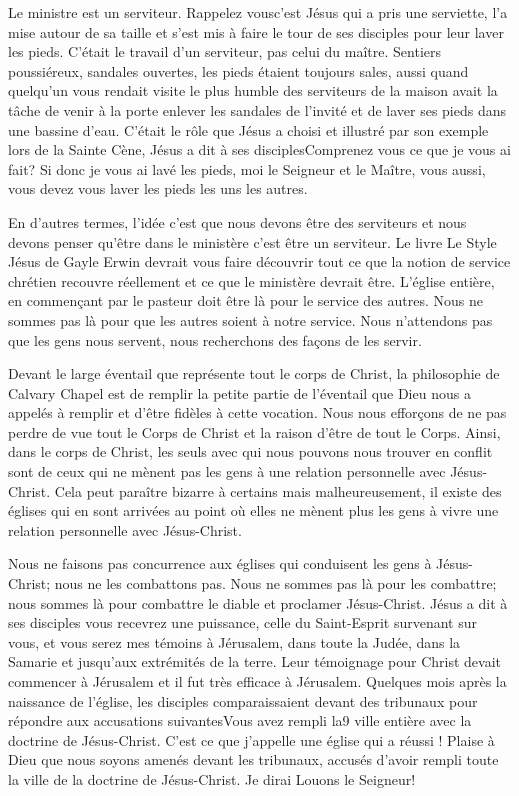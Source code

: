 Le ministre est un serviteur. Rappelez vous\frcolon c’est Jésus qui a pris une serviette, l'a mise autour de sa taille et s’est mis
à faire le tour de ses disciples pour leur laver les pieds. C’était le travail d’un serviteur, pas celui du maître. Sentiers
poussiéreux, sandales ouvertes, les pieds étaient toujours sales, aussi quand quelqu’un vous rendait visite le plus
humble des serviteurs de la maison avait la tâche de venir à la porte enlever les sandales de l’invité et de laver ses
pieds dans une bassine d’eau. C’était le rôle que Jésus a choisi et illustré par son exemple lors de la Sainte Cène,
Jésus a dit à ses disciples\frcolon\og Comprenez vous ce que je vous ai fait? Si donc je vous ai lavé les pieds, moi le Seigneur
et le Maître, vous aussi, vous devez vous laver les pieds les uns les autres.\fg{}

En d’autres termes, l’idée c'est que nous devons être des serviteurs et nous devons penser qu'être dans le ministère
c'est être un serviteur. Le livre \og Le Style Jésus\fg{} de Gayle Erwin devrait vous faire découvrir tout ce que la notion de
service chrétien recouvre réellement et ce que le ministère devrait être. L’église entière, en commençant par le
pasteur doit être là pour le service des autres. Nous ne sommes pas là pour que les autres soient à notre service.
Nous n’attendons pas que les gens nous servent, nous recherchons des façons de les servir.

Devant le large éventail que représente tout le corps de Christ, la philosophie de Calvary Chapel est de remplir la
petite partie de l’éventail que Dieu nous a appelés à remplir et d’être fidèles à cette vocation. Nous nous efforçons de
ne pas perdre de vue tout le Corps de Christ et la raison d'être de tout le Corps. Ainsi, dans le corps de Christ, les
seuls avec qui nous pouvons nous trouver en conflit sont de ceux qui ne mènent pas les gens à une relation
personnelle avec Jésus-Christ. Cela peut paraître bizarre à certains mais malheureusement, il existe des églises qui en
sont arrivées au point où elles ne mènent plus les gens à vivre une relation personnelle avec Jésus-Christ.

Nous ne faisons pas concurrence aux églises qui conduisent les gens à Jésus-Christ; nous ne les combattons pas.
Nous ne sommes pas là pour les combattre; nous sommes là pour combattre le diable et proclamer Jésus-Christ.
Jésus a dit à ses disciples \og vous recevrez une puissance, celle du Saint-Esprit survenant sur vous, et vous serez mes
témoins à Jérusalem, dans toute la Judée, dans la Samarie et jusqu’aux extrémités de la terre.\fg{} Leur témoignage pour
Christ devait commencer à Jérusalem et il fut très efficace à Jérusalem. Quelques mois après la naissance de l’église,
les disciples comparaissaient devant des tribunaux pour répondre aux accusations suivantes\frcolon\og Vous avez rempli la9
ville entière avec la doctrine de Jésus-Christ.\fg{} C’est ce que j’appelle une église qui a réussi ! Plaise à Dieu que nous
soyons amenés devant les tribunaux, accusés d’avoir rempli toute la ville de la doctrine de Jésus-Christ. Je dirai\frcolon
\og Louons le Seigneur! \fg{}

